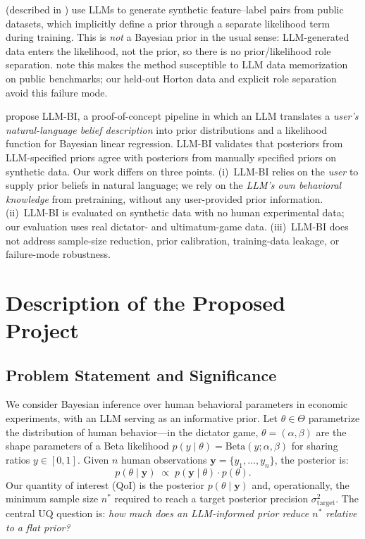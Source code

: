 \documentclass[11pt]{article}
\begin{document}
\citet{gouk2024autoprior} (described in \citealt{capstick2024autoelicit})
use LLMs to generate synthetic feature--label pairs from public
datasets, which implicitly define a prior through a separate likelihood
term during training.
This is \emph{not} a Bayesian prior in the usual sense: LLM-generated
data enters the likelihood, not the prior, so there is no
prior/likelihood role separation.
\citeauthor{capstick2024autoelicit} note this makes the method
susceptible to LLM data memorization on public benchmarks; our
held-out Horton data and explicit role separation avoid this failure
mode.

\citet{huang2025llmbi} propose LLM-BI, a proof-of-concept pipeline in
which an LLM translates a \emph{user's natural-language belief
description} into prior distributions and a likelihood function for
Bayesian linear regression.
LLM-BI validates that posteriors from LLM-specified priors agree with
posteriors from manually specified priors on synthetic data.
Our work differs on three points.
(i)~LLM-BI relies on the \emph{user} to supply prior beliefs in
natural language; we rely on the \emph{LLM's own behavioral knowledge}
from pretraining, without any user-provided prior information.
(ii)~LLM-BI is evaluated on synthetic data with no human experimental
data; our evaluation uses real dictator- and ultimatum-game data.
(iii)~LLM-BI does not address sample-size reduction, prior
calibration, training-data leakage, or failure-mode robustness.

\section{Description of the Proposed Project}

\subsection{Problem Statement and Significance}

We consider Bayesian inference over human behavioral parameters in economic
experiments, with an LLM serving as an informative prior.
Let $\theta \in \Theta$ parametrize the distribution of human behavior---in
the dictator game, $\theta = (\alpha, \beta)$ are the shape parameters of a
Beta likelihood $p(y \mid \theta) = \mathrm{Beta}(y; \alpha, \beta)$ for
sharing ratios $y \in [0,1]$.
Given $n$ human observations $\mathbf{y} = \{y_1, \ldots, y_n\}$, the
posterior is:
%
\begin{equation}
  p(\theta \mid \mathbf{y}) \;\propto\; p(\mathbf{y} \mid \theta)\cdot p(\theta).
  \label{eq:bayes}
\end{equation}
%
Our quantity of interest (QoI) is the posterior $p(\theta \mid \mathbf{y})$
and, operationally, the minimum sample size $n^*$ required to reach a target
posterior precision $\sigma^2_{\mathrm{target}}$.
The central UQ question is: \textit{how much does an LLM-informed prior
reduce $n^*$ relative to a flat prior?}
\end{document}
